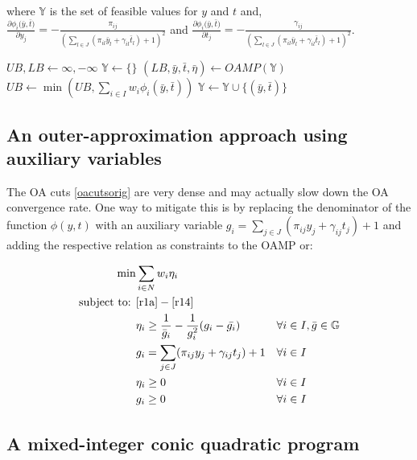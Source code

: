 \documentclass[num-refs]{wiley-networks}
\begin{document}
\noindent where $\mathbb{Y}$ is the set of feasible values for $y$ and $t$ and, 
$ \frac{\partial{\phi_i(\bar{y},\bar{t}})}{\partial{y_j}} = - \frac{\pi_{ij}}{(\sum_{l \in J} (\pi_{il} \bar{y}_l + \gamma_{il} \bar{t}_l) + 1)^2}$
and $ \frac{\partial{\phi_i(\bar{y},\bar{t}})}{\partial{t_j}} = - \frac{\gamma_{ij}}{(\sum_{l \in J} (\pi_{il} \bar{y}_l + \gamma_{il} \bar{t}_l) + 1)^2}$.

\begin{algorithm}
\caption{A basic OA algorithm for the problem \label{alg:basicoacutloop}}
\SetAlgoLined
$UB,LB \gets \infty,-\infty$ \;
$\mathbb{Y}\gets \{\}$\; 
 {
    $(LB,\bar{y},\bar{t},\bar{\eta}) \gets OAMP(\mathbb{Y})$ \;
    $UB \gets \min(UB,\displaystyle\sum_{i \in I} w_i \phi_i(\bar{y},\bar{t}))$ \;
    $\mathbb{Y} \gets \mathbb{Y} \cup \{(\bar{y},\bar{t})\}$\;}
\end{algorithm}

\subsection{An outer-approximation approach using auxiliary variables}

The  OA cuts \eqref{oacutsorig} are very dense and may actually slow down the OA convergence rate. One way to mitigate this is by replacing the denominator of the function $\phi(y,t)$ with an
auxiliary variable $g_i = \sum_{j \in J} (\pi_{ij} y_j + \gamma_{ij} t_j) + 1$ and adding the respective relation
as constraints to the OAMP or:

\begin{align}
    \label{oagminof} \min & \sum_{i \in N}w_i \eta_i && \\
    \label{oagminr1} \text{subject to: } & \eqref{r1a}-\eqref{r14} && \\
    \label{oacutsgorig}  & \eta_i \geq \frac{1}{\bar{g}_i} - \frac{1}{g_i^2}(g_i - \bar{g_i}) && \forall i\in I, \bar{g} \in \mathbb{G}\\
    \label{oagr} & g_i = \sum_{j \in J} (\pi_{ij} y_j + \gamma_{ij} t_j) + 1 && \forall i \in I\\
    \label{oaetaorig} & \eta_i \geq 0 && \forall i \in I  \\
    \label{oag} & g_i \geq 0 && \forall i \in I 
\end{align}

\subsection{A mixed-integer conic quadratic program}
\end{document}

